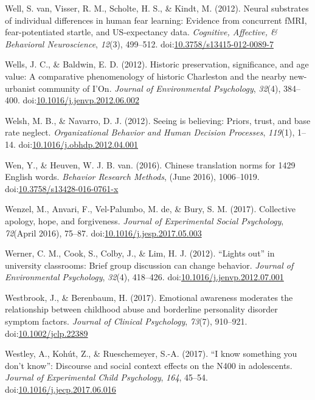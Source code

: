 \documentclass[english,man]{apa6}
\theoremstyle{definition}
\theoremstyle{definition}
\theoremstyle{definition}
\theoremstyle{remark}
\begin{document}
\hypertarget{ref-VanWell2012}{}
Well, S. van, Visser, R. M., Scholte, H. S., \& Kindt, M. (2012). Neural
substrates of individual differences in human fear learning: Evidence
from concurrent fMRI, fear-potentiated startle, and US-expectancy data.
\emph{Cognitive, Affective, \& Behavioral Neuroscience}, \emph{12}(3),
499--512.
doi:\href{https://doi.org/10.3758/s13415-012-0089-7}{10.3758/s13415-012-0089-7}

\hypertarget{ref-Wells2012}{}
Wells, J. C., \& Baldwin, E. D. (2012). Historic preservation,
significance, and age value: A comparative phenomenology of historic
Charleston and the nearby new-urbanist community of I'On. \emph{Journal
of Environmental Psychology}, \emph{32}(4), 384--400.
doi:\href{https://doi.org/10.1016/j.jenvp.2012.06.002}{10.1016/j.jenvp.2012.06.002}

\hypertarget{ref-Welsh2012}{}
Welsh, M. B., \& Navarro, D. J. (2012). Seeing is believing: Priors,
trust, and base rate neglect. \emph{Organizational Behavior and Human
Decision Processes}, \emph{119}(1), 1--14.
doi:\href{https://doi.org/10.1016/j.obhdp.2012.04.001}{10.1016/j.obhdp.2012.04.001}

\hypertarget{ref-Wen2016}{}
Wen, Y., \& Heuven, W. J. B. van. (2016). Chinese translation norms for
1429 English words. \emph{Behavior Research Methods}, (June 2016),
1006--1019.
doi:\href{https://doi.org/10.3758/s13428-016-0761-x}{10.3758/s13428-016-0761-x}

\hypertarget{ref-Wenzel2017}{}
Wenzel, M., Anvari, F., Vel-Palumbo, M. de, \& Bury, S. M. (2017).
Collective apology, hope, and forgiveness. \emph{Journal of Experimental
Social Psychology}, \emph{72}(April 2016), 75--87.
doi:\href{https://doi.org/10.1016/j.jesp.2017.05.003}{10.1016/j.jesp.2017.05.003}

\hypertarget{ref-Werner2012}{}
Werner, C. M., Cook, S., Colby, J., \& Lim, H. J. (2012). ``Lights out''
in university classrooms: Brief group discussion can change behavior.
\emph{Journal of Environmental Psychology}, \emph{32}(4), 418--426.
doi:\href{https://doi.org/10.1016/j.jenvp.2012.07.001}{10.1016/j.jenvp.2012.07.001}

\hypertarget{ref-Westbrook2017}{}
Westbrook, J., \& Berenbaum, H. (2017). Emotional awareness moderates
the relationship between childhood abuse and borderline personality
disorder symptom factors. \emph{Journal of Clinical Psychology},
\emph{73}(7), 910--921.
doi:\href{https://doi.org/10.1002/jclp.22389}{10.1002/jclp.22389}

\hypertarget{ref-Westley2017}{}
Westley, A., Kohút, Z., \& Rueschemeyer, S.-A. (2017). ``I know
something you don't know'': Discourse and social context effects on the
N400 in adolescents. \emph{Journal of Experimental Child Psychology},
\emph{164}, 45--54.
doi:\href{https://doi.org/10.1016/j.jecp.2017.06.016}{10.1016/j.jecp.2017.06.016}
\end{document}
